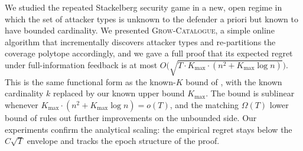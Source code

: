 \documentclass[letterpaper,9pt,twocolumn]{extarticle}
\newcommand{\Kmax}{K_{\max}}
\theoremstyle{plain}
\theoremstyle{definition}
\theoremstyle{remark}
\begin{document}
We studied the repeated Stackelberg security game in a new, open regime
in which the set of attacker types is unknown to the defender a priori
but known to have bounded cardinality. We presented \textsc{Grow-Catalogue},
a simple online algorithm that incrementally discovers attacker types and
re-partitions the coverage polytope accordingly, and we gave a full proof
that its expected regret under full-information feedback is at most
$O\!\bigl(\sqrt{T\cdot\Kmax\cdot(n^2+\Kmax\log n)}\bigr)$. This is the
same functional form as the known-$K$ bound of \citet[Theorem 5.1]{balcan2015},
with the known cardinality $k$ replaced by our known upper bound $\Kmax$.
The bound is sublinear whenever $\Kmax\cdot(n^2+\Kmax\log n)=o(T)$, and
the matching $\Omega(T)$ lower bound of \citet[Theorem 7.1]{balcan2015}
rules out further improvements on the unbounded side. Our experiments
confirm the analytical scaling: the empirical regret stays below the
$C\sqrt T$ envelope and tracks the epoch structure of the proof.




\end{document}
